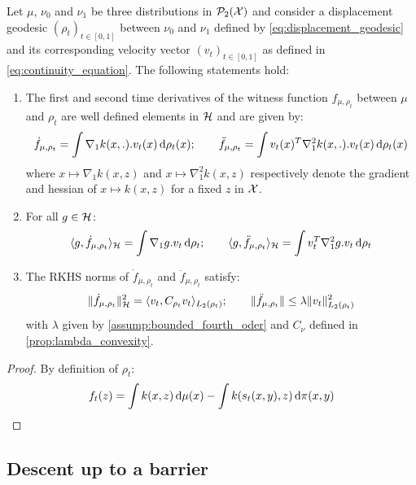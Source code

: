 \begin{lemma}\label{lem:derivatives_witness}
	Let  $\mu$, $\nu_0$ and $\nu_1$ be three distributions in $\mathcal{P}_2({{\mathcal X}})$ and consider a displacement geodesic $(\rho_t)_{t\in[0,1]}$ between $\nu_0$ and $\nu_1$  defined by \cref{eq:displacement_geodesic} 
	and its corresponding velocity vector $(v_t)_{t\in [0,1]}$ as defined in \cref{eq:continuity_equation}. The following statements hold:
	\begin{enumerate}
		\item The first and second time derivatives of the witness function $f_{\mu,\rho_t}$ between $\mu$ and $\rho_t$ are well defined elements in $ {{\mathcal H}}$ and are given by:
		\begin{align}\label{eq:derivatives_witness}
		\dot{f}_{\mu,\rho_t} = \int \nabla_1 k(x,.).v_t(x) \mathop{}\!\mathrm{d} \rho_t(x); \qquad
		\ddot{f}_{\mu,\rho_t} = \int v_t(x)^T\nabla_1^2 k(x,.).v_t(x) \mathop{}\!\mathrm{d} \rho_t(x)
		\end{align}
		where $ x \mapsto \nabla_1 k(x,z)$ and $x\mapsto \nabla_1^2 k(x,z)$ respectively denote the gradient and hessian of $x\mapsto k(x,z)$ for a fixed $z$ in ${{\mathcal X}}$.
		\item For all $g\in {{\mathcal H}}$:
		\begin{align}\label{eq:inner_prod_deriative_witness}
		\langle g,\dot{f}_{\mu,\rho_t}\rangle_{{{\mathcal H}}} = \int \nabla_1 g.v_t \mathop{}\!\mathrm{d} \rho_t; \qquad
		\langle g,  \ddot{f}_{\mu,\rho_t}\rangle_{{{\mathcal H}}} = \int v_t^T\nabla_1^2 g.v_t \mathop{}\!\mathrm{d} \rho_t
		\end{align}
		\item The RKHS norms of $\dot{f}_{\mu,\rho_t}$ and $\ddot{f}_{\mu,\rho_t}$ satisfy:
		\begin{align}\label{eq:norm_derivative_witness}
		\Vert \dot{f}_{\mu,\rho_t}\Vert_{{{\mathcal H}}}^2 = \langle v_t,C_{\rho_t} v_t \rangle_{L_2(\rho_t)}; \qquad  \Vert \ddot{f}_{\mu,\rho_t} \Vert\leq \lambda \Vert v_t \Vert^2_{L_2(\rho_t)}  
		\end{align}
		with $\lambda$ given by \cref{assump:bounded_fourth_oder} and $C_{\nu}$ defined in \cref{prop:lambda_convexity}. 
	\end{enumerate} 
\end{lemma}
\begin{proof}
	By definition of $\rho_{t}$:
	\[
	f_t(z)= \int k(x,z)\mathop{}\!\mathrm{d} \mu(x) - \int k(s_t(x,y),z)\mathop{}\!\mathrm{d} \pi(x,y)
	\]
\end{proof}


\subsection{Descent up to a barrier}

